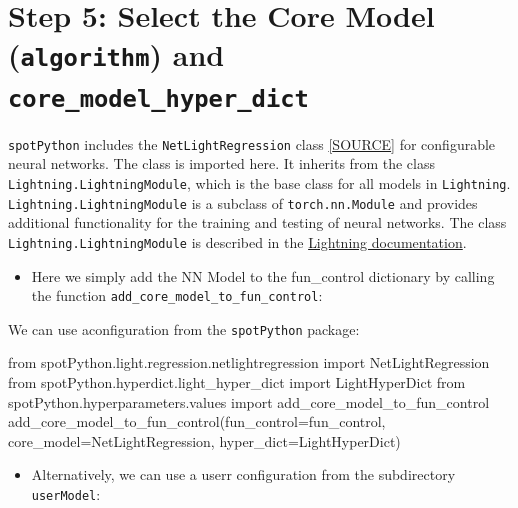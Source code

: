 \documentclass[
  letterpaper,
  DIV=11,
  numbers=noendperiod]{scrreprt}
\newenvironment{Shaded}{\begin{snugshade}}{\end{snugshade}}
\newcommand{\ImportTok}[1]{\textcolor[rgb]{0.00,0.46,0.62}{#1}}
\newcommand{\NormalTok}[1]{\textcolor[rgb]{0.00,0.23,0.31}{#1}}
\newcommand{\OperatorTok}[1]{\textcolor[rgb]{0.37,0.37,0.37}{#1}}
\providecommand{\tightlist}{%
  \setlength{\itemsep}{0pt}\setlength{\parskip}{0pt}}\usepackage{longtable,booktabs,array}
\begin{document}
\section{\texorpdfstring{Step 5: Select the Core Model
(\texttt{algorithm}) and
\texttt{core\_model\_hyper\_dict}}{Step 5: Select the Core Model (algorithm) and core\_model\_hyper\_dict}}\label{sec-selection-of-the-algorithm-33}

\texttt{spotPython} includes the \texttt{NetLightRegression} class
\href{https://github.com/sequential-parameter-optimization/spotPython/blob/main/src/spotPython/light/netlightregression.py}{{[}SOURCE{]}}
for configurable neural networks. The class is imported here. It
inherits from the class \texttt{Lightning.LightningModule}, which is the
base class for all models in \texttt{Lightning}.
\texttt{Lightning.LightningModule} is a subclass of
\texttt{torch.nn.Module} and provides additional functionality for the
training and testing of neural networks. The class
\texttt{Lightning.LightningModule} is described in the
\href{https://lightning.ai/docs/pytorch/stable/common/lightning_module.html}{Lightning
documentation}.

\begin{itemize}
\tightlist
\item
  Here we simply add the NN Model to the fun\_control dictionary by
  calling the function \texttt{add\_core\_model\_to\_fun\_control}:
\end{itemize}

We can use aconfiguration from the \texttt{spotPython} package:

\begin{Shaded}
\begin{Highlighting}[]
\ImportTok{from}\NormalTok{ spotPython.light.regression.netlightregression }\ImportTok{import}\NormalTok{ NetLightRegression}
\ImportTok{from}\NormalTok{ spotPython.hyperdict.light\_hyper\_dict }\ImportTok{import}\NormalTok{ LightHyperDict}
\ImportTok{from}\NormalTok{ spotPython.hyperparameters.values }\ImportTok{import}\NormalTok{ add\_core\_model\_to\_fun\_control}
\NormalTok{add\_core\_model\_to\_fun\_control(fun\_control}\OperatorTok{=}\NormalTok{fun\_control,}
\NormalTok{                              core\_model}\OperatorTok{=}\NormalTok{NetLightRegression,}
\NormalTok{                              hyper\_dict}\OperatorTok{=}\NormalTok{LightHyperDict)}
\end{Highlighting}
\end{Shaded}

\begin{itemize}
\tightlist
\item
  Alternatively, we can use a userr configuration from the subdirectory
  \texttt{userModel}:
\end{itemize}
\end{document}
